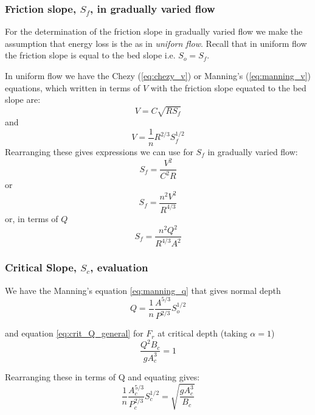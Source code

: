 \documentclass[a4paper, 12pt, british]{article} %
\numberwithin{equation}{section}
\numberwithin{figure}{section}
\numberwithin{table}{section}
\begin{document}
\subsubsection{Friction slope, $S_f$, in gradually varied flow}
\label{sec:sf}
For the determination of the friction slope in gradually varied flow we make the assumption that energy loss is the as in \textit{uniforn flow}. 
Recall that in uniform flow the friction slope is equal to the bed slope i.e. $S_o = S_f$.

In uniform flow we have the Chezy (\ref{eq:chezy_v}) or Manning's (\ref{eq:manning_v}) equations, which written in terms of $V$ with the friction slope equated to the bed slope are:
\begin{equation*}
V = C\sqrt{R S_f}
\label{eq:chezy_v_sf}
\end{equation*} 
and
\begin{equation*}
V = \frac{1}{n}R^{2/3}S_f^{1/2}
\label{eq:manning_v_sf}
\end{equation*} 
Rearranging these gives expressions we can use for $S_f$ in gradually varied flow:
\begin{equation}
S_f = \frac{V^2}{C^2R}
\label{eq:sf_chezy_v}
\end{equation}
or
\begin{equation}
S_f = \frac{n^2V^2}{R^{4/3}}
\label{eq:sf_manning_v}
\end{equation}
or, in terms of $Q$
\begin{equation}
S_f = \frac{n^2Q^2}{R^{4/3}A^2}
\label{eq:sf_manning_q}
\end{equation}

\subsubsection{Critical Slope, $S_c$, evaluation}

We have the Manning's equation \ref{eq:manning_q} that gives normal depth 
\begin{equation*}
Q = \frac{1}{n}\frac{A^{5/3}}{P^{2/3}}S_o^{1/2}
\end{equation*} 

and equation \ref{eq:crit_Q_general} for $F_r$  at critical depth (taking $\alpha = 1$)
\begin{equation*}
\frac{Q^2 B_c}{gA_c^{3}} = 1
\end{equation*}


Rearranging these in terms of Q and equating gives:
\begin{equation}
\frac{1}n{}\frac{A_c^{5/3}}{P_c^{2/3}}S_c^{1/2} = \sqrt{\frac{g A_c^3}{B_c}}
\end{equation} 
\end{document}
